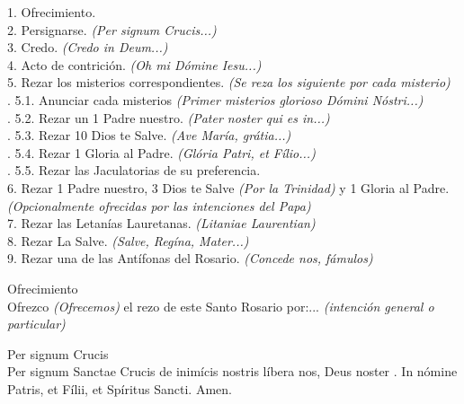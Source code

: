 \documentclass[letterpaper, landscape, 10pt, twocolumn]{article}
\begin{document}
  \noindent \normalsize 1. Ofrecimiento.\\
  2. Persignarse. {\color{red} \textit{(Per signum Crucis...)}}\\
  3. Credo. {\color{red} \textit{(Credo in Deum...)}}\\
  4. Acto de contrición. {\color{red}\textit{(Oh mi Dómine Iesu...)}}\\
  5. Rezar los misterios correspondientes. {\color{red} \textit{(Se reza los siguiente por cada misterio)}}\\
  .\hspace{0.75cm} 5.1. Anunciar cada misterios {\color{red} \textit{(Primer misterios glorioso Dómini Nóstri...)}}\\
  .\hspace{0.75cm} 5.2. Rezar un 1 Padre nuestro. {\color{red} \textit{(Pater noster qui es in...)}}\\
  .\hspace{0.75cm} 5.3. Rezar 10 Dios te Salve. {\color{red} \textit{(Ave María, grátia...)}}\\
  .\hspace{0.75cm} 5.4. Rezar 1 Gloria al Padre. {\color{red} \textit{(Glória Patri, et Fílio...)}}\\
  .\hspace{0.75cm} 5.5. Rezar las Jaculatorias de su preferencia.\\
  6. Rezar 1 Padre nuestro, 3 Dios te Salve {\color{red} \textit{(Por la Trinidad)}} y 1 Gloria al Padre. {\color{red} \textit{(Opcionalmente ofrecidas por las intenciones del Papa)}}\\
  7. Rezar las Letanías Lauretanas. {\color{red} \textit{(Litaniae Laurentian)}}\\
  8. Rezar La Salve. {\color{red} \textit{(Salve, Regína, Mater...)}}\\
  9. Rezar una de las Antífonas del Rosario. {\color{red} \textit{(Concede nos, fámulos)}}\\
  \vfill

  \Large {\color{red} Ofrecimiento}\\
  \normalsize {\color{red} O}frezco{\color{red} \textit{(Ofrecemos)}} el rezo de este Santo Rosario por:... {\color{red} \textit{(intención general o particular)}}\\
  \clearpage

  \Large {\color{red} Per signum Crucis}\\
  \normalsize {\color{red} P}er signum Sanctae Crucis {\color{red} \large \maltese} de inimícis nostris {\color{red} \large \maltese} líbera nos, Deus noster {\color{red} \large \maltese}. {\color{red} I}n nómine Patris, et Fílii, et Spíritus Sancti. {\color{red} A}men.\\
\end{document}
